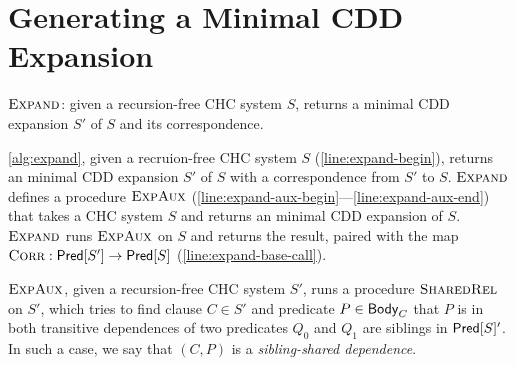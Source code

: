 \section{Generating a Minimal CDD Expansion}
\label{app:cons-cdd}
\begin{algorithm}[t]
  \caption{$\textsc{Expand}$:
    given a recursion-free CHC system $S$, returns a minimal
    CDD expansion $S'$ of $S$ and its correspondence.}
  \label{alg:expand}
\end{algorithm}
\autoref{alg:expand}, given a recruion-free CHC system $S$
(\autoref{line:expand-begin}), returns an minimal CDD expansion $S'$ of
$S$ with a correspondence from $S'$ to
$S$.
%
$\textsc{Expand}$ defines a procedure $\textsc{ExpAux}$
(\autoref{line:expand-aux-begin}---\autoref{line:expand-aux-end}) that
takes a CHC system $S$ and returns an minimal CDD expansion of 
$S$.
%
$\textsc{Expand}$ runs $\textsc{ExpAux}$ on $S$ and
returns the result, paired with the map $\textsc{Corr}: \mathsf{Pred}[ S' ] \to \mathsf{Pred}[ S ]$ 
(\autoref{line:expand-base-call}).

$\textsc{ExpAux}$, given a recursion-free CHC system $S'$,
runs a procedure $\textsc{SharedRel}$ on $S'$, which tries to
find clause $C \in S'$ and predicate $P \in \mathsf{Body}_{C}$
that $P$ is in both transitive dependences of two predicates $Q_0$ and $Q_1$ are siblings 
in $\mathsf{Pred}[ S ]'$.
%
In such a case, we say that $(C, P)$ is a
\emph{sibling-shared dependence}.


